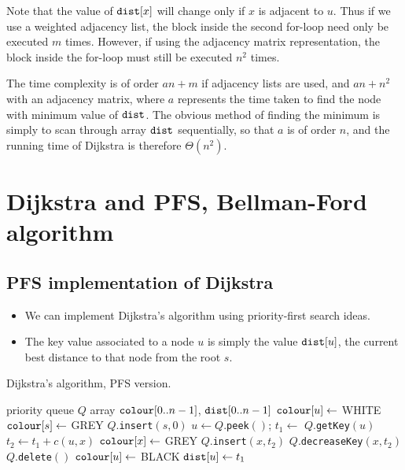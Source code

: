 Note that the value of $\operatorname{\text{\texttt{dist}}}[x]$ will change only if $x$ is adjacent to $u$.
Thus if we use a weighted adjacency list, the block inside the
second for-loop need only be executed $m$ times. 
However, if using the adjacency matrix representation, the block inside the for-loop
must still be executed $n^2$ times.

The time complexity is of order $a n + m$ if adjacency lists are used,
and $a n + n^2$ with an adjacency matrix, where $a$ represents the time
taken to find the node with minimum value of $\dist$. 
The obvious method of finding the minimum is simply to scan through array $\dist$
sequentially, so that $a$ is of order $n$, and the running time of
Dijkstra is therefore $\Theta(n^2)$. 


\chapter{Dijkstra and PFS, Bellman-Ford algorithm} %

\section{PFS implementation of Dijkstra}
\begin{itemize}
  \item We can implement Dijkstra's algorithm using priority-first search ideas. 
  \item The key value associated to a node $u$ is simply the value $\operatorname{\text{\texttt{dist}}}[u]$,
  the current best distance to that node from the root $s$.
\end{itemize}

\begin{algorithm}[H]
  \caption{Dijkstra's algorithm, PFS version.}
  \label{alg:dijkstra2}
\begin{algorithmic}[1]
	\State priority queue $Q$
	\State array $\operatorname{\text{\texttt{colour}}}[0..n-1]$, $\operatorname{\text{\texttt{dist}}}[0..n-1]$
		\State $\operatorname{\text{\texttt{colour}}}[u] \gets$ WHITE 
	\EndFor
	\State $\operatorname{\text{\texttt{colour}}}[s] \gets $ GREY
	\State $Q$.\texttt{insert}$(s, 0)$
		\State $u \gets Q$.\texttt{peek}$()$; $t_1 \gets$  $Q$.\texttt{getKey}$(u)$
			\State $t_2 \gets t_1 + c(u, x)$
				\State $\operatorname{\text{\texttt{colour}}}[x] \gets $ GREY
				\State $Q$.\texttt{insert}$(x, t_2)$
				\State $Q$.\texttt{decreaseKey}$(x, t_2)$
			\EndIf
		\EndFor
		\State $Q$.\texttt{delete}$()$
		\State $\operatorname{\text{\texttt{colour}}}[u] \gets $ BLACK
		\State $\operatorname{\text{\texttt{dist}}}[u] \gets t_1$ 
	\EndWhile
	\State \Return{$\dist$}
\EndFunction
\end{algorithmic}
\end{algorithm}

